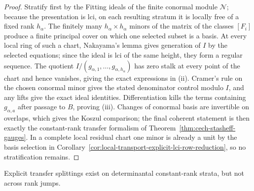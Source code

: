 \documentclass[11pt]{article}
\theoremstyle{definition}
\begin{document}
\begin{proof}
Stratify first by the Fitting ideals of the finite conormal module
$\mathcal N$; because the presentation is lci, on each resulting stratum it
is locally free of a fixed rank $h_\alpha$.  The finitely many
$h_\alpha\times h_\alpha$ minors of the matrix of the classes $[F_i]$
produce a finite principal cover on which one selected subset is a basis.
At every local ring of such a chart, Nakayama's lemma gives generation of
$I$ by the selected equations; since the ideal is lci of the same height,
they form a regular sequence.  The quotient $I/(g_{\alpha,1},\ldots,
g_{\alpha,h_\alpha})$ has zero stalk at every point of the chart and hence
vanishes, giving the exact expressions in (ii).  Cramer's rule on the chosen
conormal minor gives the stated denominator control modulo $I$, and any
lifts give the exact ideal identities.  Differentiation kills the terms
containing $g_{\alpha,a}$ after passage to $B$, proving (iii).  Changes of
conormal basis are invertible on overlaps, which gives the Koszul comparison;
the final coherent statement is then exactly the constant-rank transfer
formalism of Theorem~\ref{thm:cech-stasheff-gauges}.  In a complete local
residual chart one minor is already a unit by the basis selection in
Corollary~\ref{cor:local-transport-explicit-lci-row-reduction}, so no
stratification remains.
\end{proof}

Explicit transfer splittings exist on determinantal constant-rank strata, but not across rank jumps.
\end{document}
